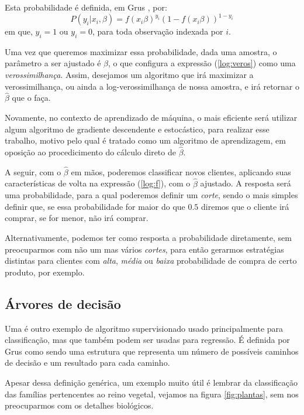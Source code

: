 Esta probabilidade é definida, em Grus \citep{data}, por:
\begin{equation}\label{log:veros}
P(y_i | x_i, \beta) = f(x_i \beta)^{y_i} (1 - f(x_i \beta))^{1-y_i}
\end{equation}
em que, $y_i = 1$ ou $y_i = 0$, para toda observação indexada por $i$.

Uma vez que queremos maximizar essa probabilidade, dada uma amostra, o parâmetro a ser ajustado é $\beta$, o que configura a expressão (\ref{log:veros}) como uma \emph{verossimilhança}. Assim, desejamos um algoritmo que irá maximizar a verossimilhança, ou ainda a log-verossimilhança de nossa amostra, e irá retornar o $\hat{\beta}$ que o faça.

Novamente, no contexto de aprendizado de máquina, o mais eficiente será utilizar algum algoritmo de gradiente descendente e estocástico, para realizar esse trabalho, motivo pelo qual é tratado como um algoritmo de aprendizagem, em oposição ao procedicimento do cálculo direto de $\hat{\beta}$.

A seguir, com o $\hat{\beta}$ em mãos, poderemos classificar novos clientes, aplicando suas características de volta na expressão (\ref{log:f}), com o $\hat{\beta}$ ajustado. A resposta será uma probabilidade, para a qual poderemos definir um \emph{corte}, sendo o mais simples definir que, se essa probabilidade for maior do que $0.5$ diremos que o cliente irá comprar, se for menor, não irá comprar.

Alternativamente, podemos ter como resposta a probabilidade diretamente, sem preocuparmos com não um mas vários \emph{cortes}, para então gerarmos estratégias distintas para clientes com \emph{alta}, \emph{média} ou \emph{baixa} probabilidade de compra de certo produto, por exemplo.

\subsection{Árvores de decisão}

Uma  é outro exemplo de algoritmo supervisionado usado principalmente para classificação, mas que também podem ser usadas para regressão. É definida por Grus \citep{data} como sendo uma estrutura que representa um número de possíveis caminhos de decisão e um resultado para cada caminho.

Apesar dessa definição genérica, um exemplo muito útil é lembrar da classificação das famílias pertencentes ao reino vegetal, vejamos na figura \ref{fig:plantas}, sem nos preocuparmos com os detalhes biológicos.

